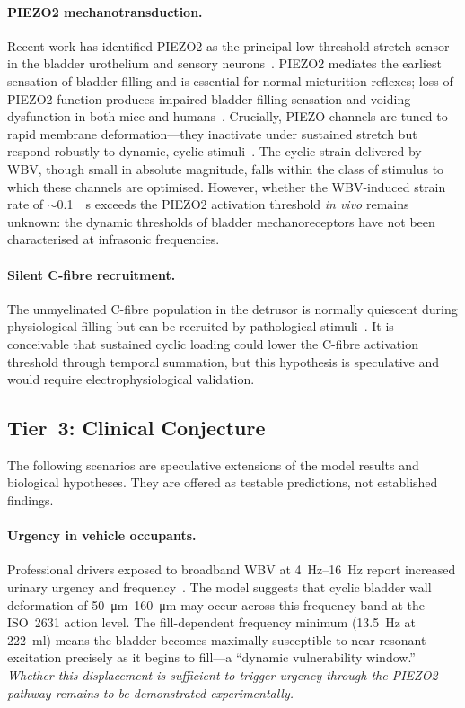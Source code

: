 \paragraph{PIEZO2 mechanotransduction.}
Recent work has identified PIEZO2 as the principal low-threshold stretch
sensor in the bladder urothelium and sensory
neurons~\cite{Marshall2020}.  PIEZO2 mediates the earliest sensation of
bladder filling and is essential for normal micturition reflexes; loss of
PIEZO2 function produces impaired bladder-filling sensation and voiding
dysfunction in both mice and
humans~\cite{Marshall2020,Dalghi2021}.  Crucially, PIEZO channels
are tuned to rapid membrane deformation---they inactivate under sustained
stretch but respond robustly to dynamic, cyclic
stimuli~\cite{coste2010piezo1}.  The cyclic strain delivered by WBV, though
small in absolute magnitude, falls within the class of stimulus to which
these channels are optimised.  However, whether the WBV-induced strain rate
of $\sim$\SI{0.1}{\per\second} exceeds the PIEZO2 activation threshold
\emph{in vivo} remains unknown: the dynamic thresholds of bladder
mechanoreceptors have not been characterised at infrasonic frequencies.

\paragraph{Silent C-fibre recruitment.}
The unmyelinated C-fibre population in the detrusor is normally quiescent
during physiological filling but can be recruited by pathological
stimuli~\cite{Fowler2008,Habler1993}.  It is conceivable that sustained
cyclic loading could lower the C-fibre activation threshold through temporal
summation, but this hypothesis is speculative and would require
electrophysiological validation.


\subsection{Tier~3: Clinical Conjecture}
\label{sec:clinical_conjecture}

The following scenarios are speculative extensions of the model results
and biological hypotheses.  They are offered as testable predictions, not
established findings.

\paragraph{Urgency in vehicle occupants.}
Professional drivers exposed to broadband WBV at
\SIrange{4}{16}{\hertz} report increased urinary urgency and
frequency~\cite{Seidel1986}.  The model suggests that cyclic bladder wall
deformation of \SIrange{50}{160}{\micro\metre} may occur across this
frequency band at the ISO~2631 action level.  The fill-dependent frequency
minimum (\SI{13.5}{\hertz} at \SI{222}{\milli\litre}) means the bladder
becomes maximally susceptible to near-resonant excitation precisely as it
begins to fill---a ``dynamic vulnerability window.''  \emph{Whether this
displacement is sufficient to trigger urgency through the PIEZO2 pathway
remains to be demonstrated experimentally.}

